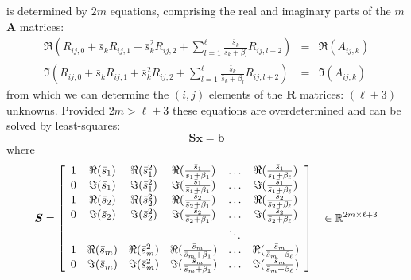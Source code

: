 \documentclass[11pt,openany,twoside]{book}
\numberwithin{equation}{section}		%
\newcommand{\Matrix}[1]{\boldsymbol{#1}}
\newcommand{\Vector}[1]{\boldsymbol{#1}}
\begin{document}
is determined by $2m$ equations, comprising the real and imaginary parts
of the $m$ $\Matrix{A}$ matrices:
\begin{eqnarray}
	\Re(R_{ij,0} + \bar{s}_k R_{ij,1}
  		+ \bar{s}_k^2 R_{ij,2} +  \sum_{l=1}^{\ell} \frac{\bar{s}_k}{\bar{s}_k +
			\beta_l} R_{ij,l+2}) &=& \Re(A_{ij,k}) \nonumber	\\
	\Im(R_{ij,0} + \bar{s}_k R_{ij,1}
  		+ \bar{s}_k^2 R_{ij,2} +  \sum_{l=1}^{\ell} \frac{\bar{s}_k}{\bar{s}_k +
			\beta_l} R_{ij,l+2}) &=& \Im(A_{ij,k})	\nonumber
\end{eqnarray}
from which we can determine the $(i,j)$ elements of the $\Matrix{R}$ matrices:
$(\ell+3)$ unknowns. Provided $2m > \ell+3$ these equations are overdetermined
and can be solved by least-squares:
\begin{equation}
\Matrix{S}\Vector{x} = \Vector{b}
\end{equation}
where
\begin{displaymath}
\Matrix{S} = \left[
\begin{array}{cccccc}
1 & \Re(\bar{s}_1) & \Re(\bar{s}_1^2) & \Re(\frac{\bar{s}_1}{\bar{s}_1 + \beta_1}) & \ldots & \Re(\frac{\bar{s}_1}{\bar{s}_1 + \beta_{\ell}}) \\
0 & \Im(\bar{s}_1) & \Im(\bar{s}_1^2) & \Im(\frac{\bar{s}_1}{\bar{s}_1 + \beta_1}) & \ldots & \Im(\frac{\bar{s}_1}{\bar{s}_1 + \beta_{\ell}}) \\
1 & \Re(\bar{s}_2) & \Re(\bar{s}_2^2) & \Re(\frac{\bar{s}_2}{\bar{s}_2 + \beta_1}) & \ldots & \Re(\frac{\bar{s}_2}{\bar{s}_2 + \beta_{\ell}}) \\
0 & \Im(\bar{s}_2) & \Im(\bar{s}_2^2) & \Im(\frac{\bar{s}_2}{\bar{s}_2 + \beta_1}) & \ldots & \Im(\frac{\bar{s}_2}{\bar{s}_2 + \beta_{\ell}}) \\
  &          &            &                                & \ddots &                           \\
1 & \Re(\bar{s}_m) & \Re(\bar{s}_m^2) & \Re(\frac{\bar{s}_m}{\bar{s}_m + \beta_1}) & \ldots & \Re(\frac{\bar{s}_m}{\bar{s}_m + \beta_{\ell}}) \\
0 & \Im(\bar{s}_m) & \Im(\bar{s}_m^2) & \Im(\frac{\bar{s}_m}{\bar{s}_m + \beta_1}) & \ldots & \Im(\frac{\bar{s}_m}{\bar{s}_m + \beta_{\ell}}) \\
\end{array}
\right]	\hspace{3mm} \in \mathbb{R}^{2m\times \ell+3}
\end{displaymath}
\end{document}
